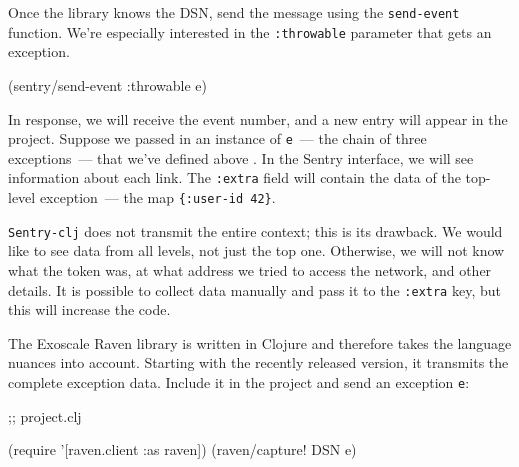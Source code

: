 \fi

Once the library knows the DSN, send the message using the \verb|send-event| function. We're especially interested in the \verb|:throwable| parameter that gets an exception.

\begin{english}
  \begin{clojure}
(sentry/send-event {:throwable e})
  \end{clojure}
\end{english}

In response, we will receive the event number, and a new entry will appear in the project.
Suppose we passed in an instance of \verb|e|~--- the chain of three exceptions~--- that we've defined above . In the Sentry interface, we will see information about each link. The \verb|:extra| field will contain the data of the top-level exception~--- the map \verb|{:user-id 42}|.

\verb|Sentry-clj| does not transmit the entire context; this is its drawback. We would like to see data from all levels, not just the top one. Otherwise, we will not know what the token was, at what address we tried to access the network, and other details. It is possible to collect data manually and pass it to the \verb|:extra| key, but this will increase the code.


The Exoscale Raven library is written in Clojure and therefore takes the language nuances into account. Starting with the recently released version, it transmits the complete exception data. Include it in the project and send an exception \verb|e|:

\begin{english}
  \begin{clojure}
 ;; project.clj

(require '[raven.client :as raven])
(raven/capture! DSN e)
  \end{clojure}
\end{english}

